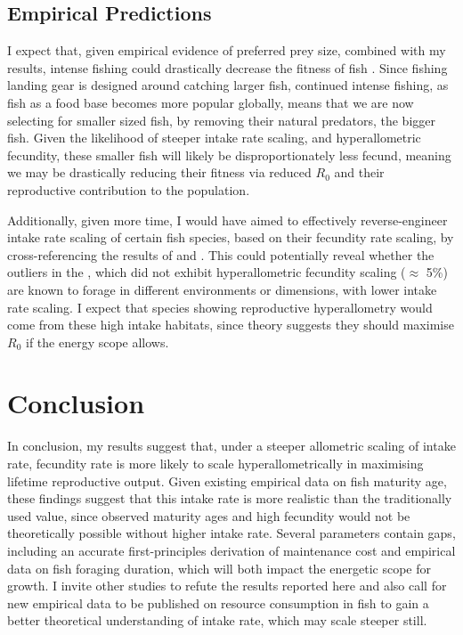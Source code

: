 \documentclass[a4paper]{article} %
\begin{document}
\subsection{Empirical Predictions}
I expect that, given empirical evidence of preferred prey size, combined with my results, intense fishing could drastically decrease the fitness of fish \autocite{Brose2006, Barnes2010, VanGemert2019}. Since fishing landing gear is designed around catching larger fish, continued intense fishing, as fish as a food base becomes more popular globally, means that we are now selecting for smaller sized fish, by removing their natural predators, the bigger fish. Given the likelihood of steeper intake rate scaling, and hyperallometric fecundity, these smaller fish will likely be disproportionately less fecund, meaning we may be drastically reducing their fitness via reduced $R_0$ and their reproductive contribution to the population.

Additionally, given more time, I would have aimed to effectively reverse-engineer intake rate scaling of certain fish species, based on their fecundity rate scaling, by cross-referencing the results of \textcite{Pawar2012} and \textcite{Barneche2018-reproductive_output}. This could potentially reveal whether the outliers in the \textcite{Barneche2018-reproductive_output}, which did not exhibit hyperallometric fecundity scaling ($\approx$ 5\%) are known to forage in different environments or dimensions, with lower intake rate scaling. I expect that species showing reproductive hyperallometry would come from these high intake habitats, since theory suggests they should maximise $R_0$ if the energy scope allows.
\section{Conclusion}\thispagestyle{plain}
In conclusion, my results suggest that, under a steeper allometric scaling of intake rate, fecundity rate is more likely to scale hyperallometrically in maximising lifetime reproductive output. Given existing empirical data on fish maturity age, these findings suggest that this intake rate is more realistic than the traditionally used value, since observed maturity ages and high fecundity would not be theoretically possible without higher intake rate. Several parameters contain gaps, including an accurate first-principles derivation of maintenance cost and empirical data on fish foraging duration, which will both impact the energetic scope for growth. I invite other studies to refute the results reported here and also call for new empirical data to be published on resource consumption in fish to gain a better theoretical understanding of intake rate, which may scale steeper still.

\newpage\let\mkbibnamefamily\textsc\printbibliography[title=References]\thispagestyle{plain} %

% 
\end{document}
